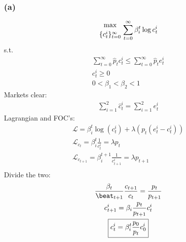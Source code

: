 \documentclass[10pt, a4paper]{article}
\begin{document}
    \subsubsection*{(a)}
      \begin{gather*}
        {\max\atop{\{c_t^i\}_{t=0}^{\infty}}}\sum\limits_{t=0}^{\infty}\beta_i^t\log{c_t^i}
      \end{gather*}
      s.t.
      \begin{gather*}
        \sum\limits_{t=0}^{\infty}\hat{p}_tc_t^i \leq\sum\limits_{t=0}^{\infty}\hat{p}_te_t^i \\
        c_t^i\geq0 \\
        0<\beta_1<\beta_2<1
      \end{gather*}
      Markets clear:
      \begin{gather*}
        \sum\limits_{i=1}^2\hat{c}_t^i = \sum\limits_{i=1}^2e_t^i
      \end{gather*}
      Lagrangian and FOC's:
      \begin{gather*}
        \mathcal{L} = \beta_i^t\log(c_t^i) + \lambda(p_t(e_t^i-c_t^i)) \\
        \mathcal{L}_{c_t} = \beta_i^t\frac{1}{c_t^i} = \lambda p_t \\
        \mathcal{L}_{c_{t+1}} = \beta_i^{t+1}\frac{1}{c_{t+1}^i} = \lambda p_{t+1} \\
      \end{gather*}
      Divide the two:
      \begin{gather*}
        \frac{\beta_t}{\beat_{t+1}} \frac{c_{t+1}}{c_t} = \frac{p_t}{p_{t+1}} \\
        c_{t+1}^i = \beta_i\frac{p_t}{p_{t+1}}c_t^i \\
        \boxed{c_{t}^i = \beta^t_i\frac{p_0}{p_{t}}c^i_0}
      \end{gather*}
\end{document}
